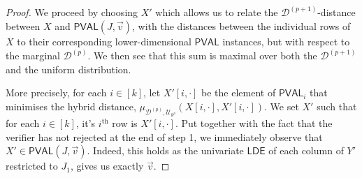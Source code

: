 \documentclass[10pt,a4paper]{article}
\newcommand{\PVAL}{\mathsf{PVAL}}
\newcommand{\LDE}{\mathsf{LDE}}
\newcommand{\sD}{\mathcal{D}}
\begin{document}
\begin{proof}
We proceed by choosing $X'$ which allows us to relate the $\sD^{(p+1)}$-distance between $X$ and $\PVAL(J,\Vec{v})$, with the distances between the individual rows of $X$ to their corresponding lower-dimensional $\PVAL$ instances, but with respect to the marginal $\sD^{(p)}$. We then see that this sum is maximal over both the $\mathcal{D}^{(p+1)}$ and the uniform distribution. 

More precisely, for each $i\in[k]$, let $X'[i,\cdot]$ be the element of $\PVAL_{i}$ that minimises the hybrid distance, $\mu_{\mathcal{D}^{(p)},\mathcal{U}_{k^{p}}}(X[i,\cdot], X'[i,\cdot])$. We set $X'$ such that for each $i \in [k]$, it's $i^{\text{th}}$ row is $X'[i,\cdot]$. Put together with the fact that the verifier has not rejected at the end of step 1, we immediately observe that $X' \in \PVAL(J,\vec{v})$. Indeed, this holds as the univariate $\LDE$ of each column of $Y'$ restricted to $J_1$, gives us exactly $\Vec{v}$.


\end{proof}
\end{document}

